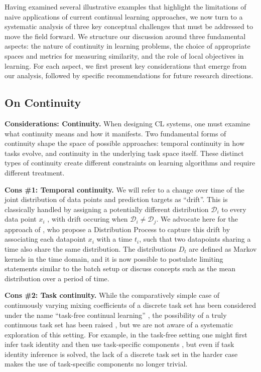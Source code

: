 
Having examined several illustrative examples that highlight the limitations of naive applications of current continual learning approaches, we now turn to a systematic analysis of three key conceptual challenges that must be addressed to move the field forward.
We structure our discussion around three fundamental aspects: the nature of continuity in learning problems, 
the choice of appropriate spaces and metrics for measuring similarity, and the role of local objectives in learning.
For each aspect, we first present key considerations that emerge from our analysis, 
followed by specific recommendations for future research directions.


\subsection{On Continuity} 
\begin{tcolorbox}[colback=orange!10,colframe=orange!50,boxsep=-1pt]
\textbf{Considerations: Continuity.}
When designing CL systems, one must examine what continuity means and how it manifests. Two fundamental forms of continuity shape the space of possible approaches: temporal continuity in how tasks evolve, and continuity in the underlying task space itself. These distinct types of continuity create different constraints on learning algorithms and require different treatment.
\end{tcolorbox}

\textbf{Cons \#1: Temporal continuity.}
We will refer to a change over time of the joint distribution of data points and prediction targets as ``drift''.
This is classically handled by assigning a potentially different distribution $\mathcal{D}_i$ to every data point $x_i$ \cite{gama2014survey},
with drift occuring when $\mathcal{D}_i \neq \mathcal{D}_j$.
We advocate here for the approach of \citet{hinder2020towards}, who propose a 
Distribution Process to capture this drift
by associating each datapoint $x_i$ with a time $t_i$, such that two datapoints sharing a time also share the same distribution.
The distributions $D_t$ are defined as Markov kernels in the time domain,
and it is now possible to postulate limiting statements similar to the batch setup or discuss concepts such as the mean distribution over a period of time.

\textbf{Cons \#2: Task continuity.}
While the comparatively simple case of continuously varying mixing coefficients of a discrete task set has been considered under the name ``task-free continual learning'' \cite{Lee2020A, jin2021gradient, shanahan2021encoders}, the possibility of a truly continuous task set has been raised \cite{van2022three}, but we are not aware of a systematic exploration of this setting.
For example, in the task-free setting one might first infer task identity and then use task-specific components \cite{heald2021contextual},
but even if task identity inference is solved,
the lack of a discrete task set in the harder case makes the use of task-specific components no longer trivial.

